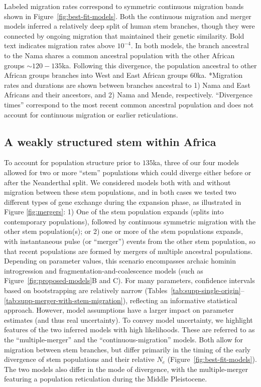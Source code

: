 \documentclass[]{article}
\begin{document}
\begin{table}[t!]
{        Labeled migration rates correspond to symmetric continuous migration
        bands shown in Figure~\ref{fig:best-fit-models}. Both the continuous migration and
        merger models inferred a relatively deep split of human stem branches,
        though they were connected by ongoing migration that maintained their
        genetic similarity. Bold text indicates migration rates above $10^{-4}$.
        In both models, the branch ancestral to the Nama shares a common ancestral population
        with the other African groups $\sim120-135$ka. Following this divergence,
        the population ancestral to other African groups branches into West and East African
        groups $60$ka.
        *Migration rates and durations are shown between branches ancestral to 
        1) Nama and East Africans and their ancestors, and
        2) Nama and Mende, respectively.
        ``Divergence times'' correspond to the most recent common ancestral population
        and does not account for continuous migration or earlier reticulations.
    }
    \label{tab:migration-rates}
\end{table}

\subsection*{A weakly structured stem within Africa}

To account for population structure prior to $135$ka, three of our four models
allowed for two or more ``stem'' populations which could diverge either before
or after the Neanderthal split. We considered models both with and without
migration between these stem populations, and in both cases we tested two
different types of gene exchange during the expansion phase, as illustrated in
Figure \ref{fig:mergers}: 1) One of the stem population expands (splits into
contemporary populations), followed by continuous symmetric migration with
the other stem population(s); or 2) one or more of the stem
populations expands, with instantaneous pulse (or ``merger'') events from the
other stem population, so that recent populations are formed by mergers of
multiple ancestral populations. Depending on parameter values, this scenario
encompasses archaic hominin introgression and fragmentation-and-coalescence
models (such as Figure~\ref{fig:proposed-models}B and C). For many parameters,
confidence intervals based on bootstrapping are relatively narrow
(Tables~\ref{tab:supp-single-origin}--\ref{tab:supp-merger-with-stem-migration}),
reflecting an informative statistical approach. However, model assumptions have
a larger impact on parameter estimates (and thus real uncertainty).
To convey model uncertainty, we highlight features of the two inferred models
with high likelihoods. These are referred to as the ``multiple-merger'' and the
``continuous-migration'' models. Both allow for migration between stem
branches, but differ primarily in the timing of the early divergence of stem
populations and their relative $N_e$ (Figure~\ref{fig:best-fit-models}). The
two models also differ in the mode of divergence, with the multiple-merger
featuring a population reticulation during the Middle Pleistocene.
\end{document}
